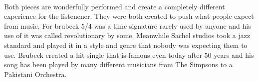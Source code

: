 \documentclass{article}
\begin{document}
\\%
Both pieces are wonderfully performed and create a completely different
experience for the listenener. They were both created to push what people expect
from music. For brubeck 5/4 was a time signature rarely used by anyone and his
use of it was called revolutionary by some. Meanwhile Sachel studios took a jazz
standard and played it in a style and genre that nobody was expecting them to
use. Brubeck created a hit single that is famous even today after 50 years and
his song has been played by many different musicians from The Simpsons to a
Pakistani Orchestra.
\end{document}
